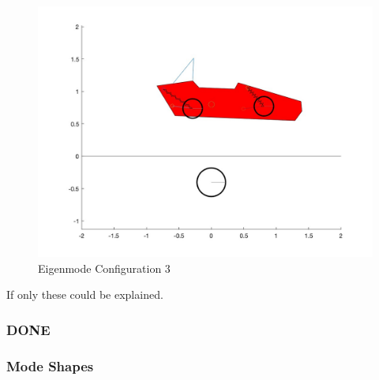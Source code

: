 \begin{figure}[ht]
    \centering
    \includegraphics[scale=0.235]{images/mode3.jpg}
    \caption{Eigenmode Configuration 3}
    \label{fig:mode_3}
\end{figure}

If only these could be explained.

\subsubsection{DONE}
\subsubsection{Mode Shapes}